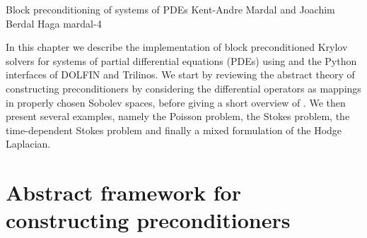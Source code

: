               {Block preconditioning of systems of PDEs}
              {Kent-Andre Mardal and Joachim Berdal Haga}
              {mardal-4}

\newcommand{\algorithmexample}[3]{%
\begin{figure}
  \small
  \begin{tabular}{l}
    \toprule
    \textbf{Algorithm example #1:} #2 \\
    \midrule
    \begin{minipage}{0.9\textwidth}
      \vspace{0.1cm}
      \begin{enumerate}
        #3
      \end{enumerate}
      \vspace{0.1cm}
    \end{minipage} \\
    \bottomrule
  \end{tabular}
  \normalsize
\end{figure}}

In this chapter we describe the implementation of block preconditioned
Krylov solvers for systems of partial differential equations (PDEs)
using  and the Python interfaces of
DOLFIN and Trilinos.  We start by reviewing the
abstract theory of constructing preconditioners
by considering the differential operators as mappings in properly
chosen Sobolev spaces, before giving a short overview
of . We then present several examples, namely the
Poisson problem, the Stokes problem, the time-dependent Stokes problem
and finally a mixed formulation of the Hodge Laplacian.

\section{Abstract framework for constructing preconditioners}

